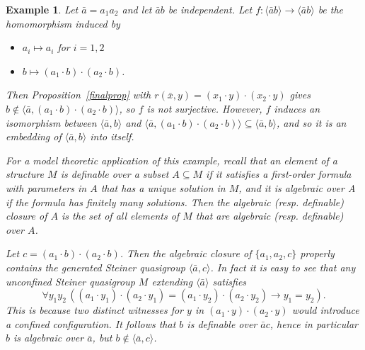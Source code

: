 \documentclass[a4paper, 11pt]{article}
\theoremstyle{note}
\newtheorem{ex}[thm]{Example}
\begin{document}
	\begin{ex}\label{ex1}
		Let $\bar{a}=a_1a_2$ and let $\bar{a}b$ be independent. Let  $f:\langle\bar{a}b\rangle \rightarrow \langle \bar{a}b\rangle$ be the homomorphism induced  by 
		\begin{itemize}
			\item $a_i\mapsto a_i$ for $i=1,2$
			\item $b\mapsto (a_1 \cdot b)\cdot  (a_2\cdot  b)$.
		\end{itemize}
		Then Proposition~\ref{finalprop} with $r(\bar{x}, y)=(x_1\cdot y)\cdot (x_2\cdot y)$ gives $b\not\in\langle\bar{a},(a_1\cdot  b)\cdot  (a_2\cdot  b)\rangle$, so $f$ is not surjective. However, $f$ induces an isomorphism between $\langle \bar{a},b\rangle$ and $\langle \bar{a}, (a_1\cdot b)\cdot (a_2\cdot b)\rangle \subseteq \langle \bar{a},b\rangle$, and so it is an embedding of $\langle\bar{a},b\rangle$ into itself.
		
For a model theoretic application of this example,  recall that an element of a structure $M$ is \textit{definable} over a subset $A\subseteq M$ if it satisfies a first-order formula with parameters in $A$ that has a unique solution in $M$, and it is \textit{algebraic} over A if the formula has finitely many solutions. Then the algebraic (resp. definable) closure of $A$ is the set of all elements of $M$ that are algebraic (resp. definable) over $A$. 

Let $c=(a_1\cdot b)\cdot (a_2\cdot b)$. Then  the algebraic closure of $\{a_1,a_2,c \}$ properly contains the generated Steiner quasigroup $\langle \bar{a},c \rangle$.  In fact  it is easy to see that any unconfined Steiner quasigroup $M$ extending $\langle \bar{a}\rangle$ satisfies 
$$ \forall y_1 y_2 \,( (a_1\cdot y_1)\cdot (a_2\cdot y_1)=(a_1\cdot y_2)\cdot (a_2\cdot y_2) \rightarrow y_1=y_2).$$
This is because two distinct witnesses for $y$ in $(a_1\cdot y)\cdot (a_2\cdot y)$ would introduce a confined configuration.
It follows that $b$ is definable over $\bar{a}c$, hence in particular $b$ is algebraic over $\bar{a}$, but $b \notin \langle \bar{a},c \rangle$.
\end{ex}
\end{document}
